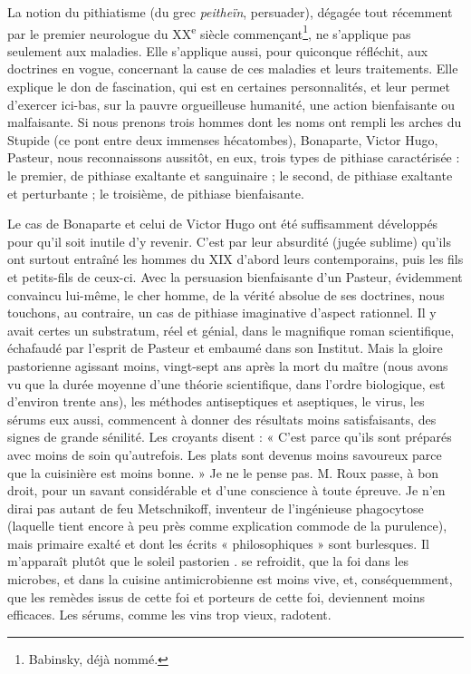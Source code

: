 \documentclass[french,twoside]{book} %
\begin{document}
La notion du pithiatisme (du grec {\itshape peitheïn}, persuader), dégagée tout récemment par le premier neurologue du XX\textsuperscript{e} siècle commençant\footnote{ Babinsky, déjà nommé.}, ne s’applique pas seulement aux maladies. Elle s’applique aussi, pour quiconque réfléchit, aux doctrines en vogue, concernant la cause de ces maladies et leurs traitements. Elle explique le don de fascination, qui est en certaines personnalités, et leur permet d’exercer ici-bas, sur la pauvre orgueilleuse humanité, une action bienfaisante ou malfaisante. Si nous prenons trois hommes dont les noms ont rempli les arches du Stupide (ce pont entre deux immenses hécatombes), Bonaparte, Victor Hugo, Pasteur, nous reconnaissons aussitôt, en eux, trois types de pithiase caractérisée : le premier, de pithiase exaltante et sanguinaire ; le second, de pithiase exaltante et perturbante ; le troisième, de pithiase bienfaisante.\par
Le cas de Bonaparte et celui de Victor Hugo ont été suffisamment développés pour qu’il soit inutile d’y revenir. C’est par leur absurdité (jugée sublime) qu’ils ont surtout entraîné les hommes du XIX d’abord leurs contemporains, puis les fils et petits-fils de ceux-ci. Avec la persuasion bienfaisante d’un Pasteur, évidemment convaincu lui-même, le cher homme, de la vérité absolue de ses doctrines, nous touchons, au contraire, un cas de pithiase imaginative d’aspect rationnel. Il y avait certes un substratum, réel et génial, dans le magnifique roman scientifique, échafaudé par l’esprit de Pasteur et embaumé dans son Institut. Mais la gloire pastorienne agissant moins, vingt-sept ans après la mort du maître (nous avons vu que la durée moyenne d’une théorie scientifique, dans l’ordre biologique, est d’environ trente ans), les méthodes antiseptiques et aseptiques, le virus, les sérums eux aussi, commencent à donner des résultats moins satisfaisants, des signes de grande sénilité. Les croyants disent : « C’est parce qu’ils sont préparés avec moins de soin qu’autrefois. Les plats sont devenus moins savoureux parce que la cuisinière est moins bonne. » Je ne le pense pas. M. Roux passe, à bon droit, pour un savant considérable et d’une conscience à toute épreuve. Je n’en dirai pas autant de feu Metschnikoff, inventeur de l’ingénieuse phagocytose (laquelle tient encore à peu près comme explication commode de la purulence), mais primaire exalté et dont les écrits « philosophiques » sont burlesques. Il m’apparaît plutôt que le soleil pastorien . se refroidit, que la foi dans les microbes, et dans la cuisine antimicrobienne est moins vive, et, conséquemment, que les remèdes issus de cette foi et porteurs de cette foi, deviennent moins efficaces. Les sérums, comme les vins trop vieux, radotent.\par
\end{document}
